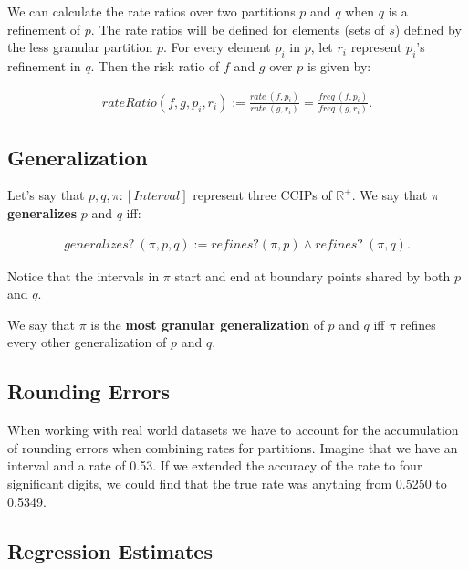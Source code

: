 \documentclass[]{article}
\begin{document}
We can calculate the rate ratios over two partitions \(p\) and \(q\)
when \(q\) is a refinement of \(p\). The rate ratios will be defined for
elements (sets of \(s\)) defined by the less granular partition \(p\).
For every element \(p_i\) in \(p\), let \(r_i\) represent \(p_i\)'s
refinement in \(q\). Then the risk ratio of \(f\) and \(g\) over \(p\)
is given by:

\begin{align*}
rateRatio (f, g, p_i, r_i) := \frac{rate\ (f, p_i)}{rate\ (g, r_i)} = \frac{freq\ (f, p_i)}{freq\ (g, r_i)}.
\end{align*}

\hypertarget{generalization}{%
\subsection{Generalization}\label{generalization}}

Let's say that \(p, q, \pi : [Interval]\) represent three CCIPs of
\(\mathbb{R}^+\). We say that \(\pi\) \textbf{generalizes} \(p\) and
\(q\) iff:

\begin{align*}
generalizes?\ (\pi, p, q) := refines? (\pi, p) \wedge refines?\ (\pi, q).
\end{align*}

Notice that the intervals in \(\pi\) start and end at boundary points
shared by both \(p\) and \(q\).

We say that \(\pi\) is the \textbf{most granular generalization} of
\(p\) and \(q\) iff \(\pi\) refines every other generalization of \(p\)
and \(q\).

\hypertarget{rounding-errors}{%
\subsection{Rounding Errors}\label{rounding-errors}}

When working with real world datasets we have to account for the
accumulation of rounding errors when combining rates for partitions.
Imagine that we have an interval and a rate of 0.53. If we extended the
accuracy of the rate to four significant digits, we could find that the
true rate was anything from 0.5250 to 0.5349.

\hypertarget{regression-estimates}{%
\subsection{Regression Estimates}\label{regression-estimates}}
\end{document}
